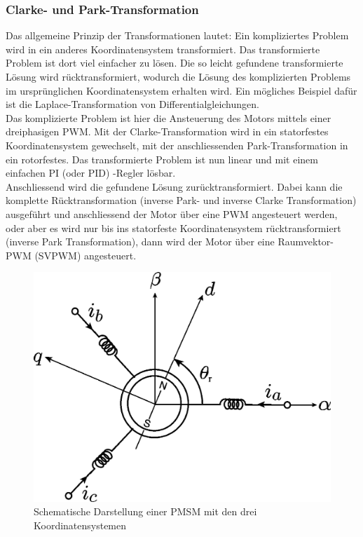 \subsubsection{Clarke- und Park-Transformation}
Das allgemeine Prinzip der Transformationen lautet:
Ein kompliziertes Problem wird in ein anderes Koordinatensystem transformiert. Das transformierte Problem ist dort viel einfacher zu lösen. Die so leicht gefundene transformierte Lösung wird rücktransformiert, wodurch die Lösung des komplizierten Problems im ursprünglichen Koordinatensystem erhalten wird. Ein mögliches Beispiel dafür ist die Laplace-Transformation von Differentialgleichungen. 
\\
Das komplizierte Problem ist hier die Ansteuerung des Motors mittels einer dreiphasigen PWM. Mit der Clarke-Transformation wird in ein statorfestes Koordinatensystem gewechselt, mit der anschliessenden Park-Transformation in ein rotorfestes. Das transformierte Problem ist nun linear und mit einem einfachen PI (oder PID) -Regler lösbar. \\
Anschliessend wird die gefundene Lösung zurücktransformiert. Dabei kann die komplette Rücktransformation (inverse Park- und inverse Clarke Transformation) ausgeführt und anschliessend der Motor über eine PWM angesteuert werden, oder aber es wird nur bis ins statorfeste Koordinatensystem rücktransformiert (inverse Park Transformation), dann wird der Motor über eine Raumvektor-PWM (SVPWM) angesteuert.


\begin{figure} [H]
	\centering
	\includegraphics[width=.45\linewidth]{images/trafo_schematicPMSM}
	\caption{Schematische Darstellung einer PMSM mit den drei Koordinatensystemen \cite{IEEE_nonlinearObserver}}
	\label{fig:trafoschematicpmsm}
\end{figure} 

